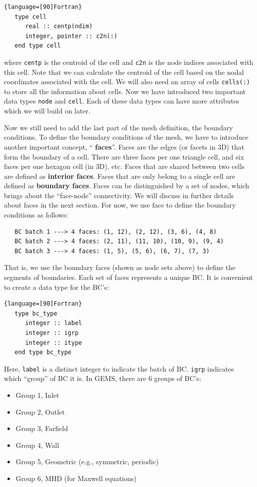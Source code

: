 \documentclass[11pt, letterpaper]{report}
\begin{document}
\begin{lstlisting}{language=[90]Fortran}
   type cell
      real :: centp(ndim)
      integer, pointer :: c2n(:)
   end type cell
\end{lstlisting}

where \verb+centp+ is the centroid of the cell and \verb+c2n+ is the node indices associated with
this cell. Note that we can calculate the centroid of the cell based on the nodal coordinates
associated with the cell. We will also need an array of cells \verb+cells(:)+ to store all the
information about cells. Now we have introduced two important data types \verb+node+ and
\verb+cell+. Each of these data types can have more attributes which we will build on later.
\paraspace

Now we still need to add the last part of the mesh definition, the boundary conditions. To define
the boundary conditions of the mesh, we have to introduce another important concept, ``{\bf
faces}''. Faces are the edges (or facets in 3D) that form the boundary of a cell. There are three
faces per one triangle cell, and six faces per one hexagon cell (in 3D), etc. Faces that are shared between
two cells are defined as {\bf interior faces}. Faces that are only belong to a single cell are
defined as {\bf boundary faces}. Faces can be distinguished by a set of nodes, which brings about
the ``face-node'' connectivity. We will discuss in further details about faces in the next section.
For now, we use face to define the boundary conditions as follows:
\begin{verbatim}
   BC batch 1 ---> 4 faces: (1, 12), (2, 12), (3, 6), (4, 8)
   BC batch 2 ---> 4 faces: (2, 11), (11, 10), (10, 9), (9, 4)
   BC batch 3 ---> 4 faces: (1, 5), (5, 6), (6, 7), (7, 3)
\end{verbatim}
That is, we use the boundary faces (shown as node sets above) to define the segments of boundaries.
Each set of faces represents a unique BC. It is convenient to create a data type for the BC's:

\begin{lstlisting}{language=[90]Fortran}
   type bc_type
      integer :: label
      integer :: igrp
      integer :: itype
   end type bc_type
\end{lstlisting}

Here, \verb+label+ is a distinct integer to indicate the batch of BC. \verb+igrp+ indicates which
``group'' of BC it is. In GEMS, there are 6 groups of BC's: 

\begin{itemize}
   \item Group 1, Inlet
   \item Group 2, Outlet
   \item Group 3, Farfield
   \item Group 4, Wall
   \item Group 5, Geometric (e.g., symmetric, periodic)
   \item Group 6, MHD (for Maxwell equations)
\end{itemize}
\end{document}
